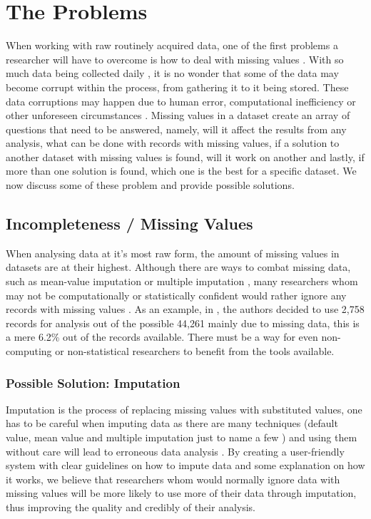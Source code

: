 \documentclass{IEEEconf}
\begin{document}

	\section{The Problems} %
	\label{sec:the_problems}
	When working with raw routinely acquired data, one of the first problems a researcher will have to overcome is how to deal with missing values \cite{rountine-missing}. With so much data being collected daily \cite{bigData}, it is no wonder that some of the data may become corrupt within the process, from gathering it to it being stored. These data corruptions may happen due to human error, computational inefficiency or other unforeseen circumstances \cite{reason}. Missing values in a dataset create an array of questions that need to be answered, namely, will it affect the results from any analysis, what can be done with records with missing values, if a solution to another dataset with missing values is found, will it work on another and lastly, if more than one solution is found, which one is the best for a specific dataset. We now discuss some of these problem and provide possible solutions.

		\subsection{Incompleteness / Missing Values} %
		\label{sub:incompleteness}
			When analysing data at it's most raw form, the amount of missing values in datasets are at their highest.
			Although there are ways to combat missing data, such as mean-value imputation or multiple imputation \cite{missing1,missing2,missing3}, many researchers whom may not be computationally or statistically confident would rather ignore any records with missing values \cite{epi1,systematic1,systematic2,systematic3}. As an example, in \cite{epi1}, the authors decided to use 2,758 records for analysis out of the possible 44,261 mainly due to missing data, this is a mere 6.2\% out of the records available. There must be a way for even non-computing or non-statistical researchers to benefit from the tools available. 
			\subsubsection{Possible Solution: Imputation} %
			\label{sub:possible_solution}
				Imputation is the process of replacing missing values with substituted values, one has to be careful when imputing data as there are many techniques (default value, mean value and multiple imputation just to name a few \cite{gelman2007data}) and using them without care will lead to erroneous data analysis \cite{careful}. By creating a user-friendly system with clear guidelines on how to impute data and some explanation on how it works, we believe that researchers whom would normally ignore data with missing values will be more likely to use more of their data through imputation, thus improving the quality and credibly of their analysis.
\end{document}
